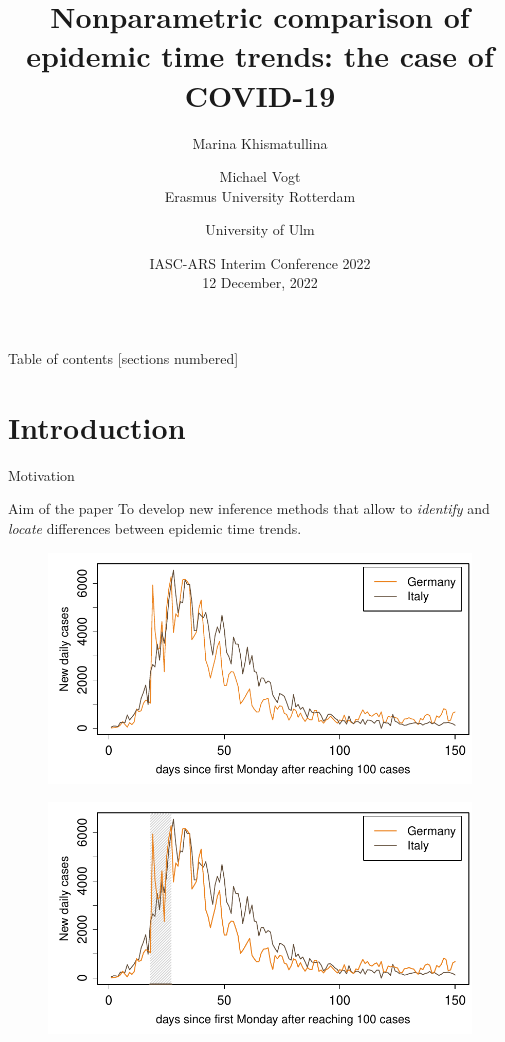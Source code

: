 \documentclass[10pt]{beamer}
\title{Nonparametric comparison of epidemic time trends: the case of COVID-19}
\author{Marina Khismatullina \and \hspace{11mm} Michael Vogt \\ Erasmus University Rotterdam \and University of Ulm}
\date{\vspace{5mm} IASC-ARS Interim Conference 2022 \\ 12 December, 2022}
\begin{document}
\maketitle

\begin{frame}{Table of contents}
  [sections numbered]
  \tableofcontents[hideallsubsections]
\end{frame}

\section{Introduction}


\begin{frame}{Motivation}

{ \begin{block}{Aim of the paper}
	To develop new inference methods that allow to \textit{identify} and \textit{locate} differences between epidemic time trends.
\end{block}}
	{\begin{figure}
    		\centering
    		\includegraphics[height=0.45\textheight]{plots/Germany_and_Italy.pdf}
  	\end{figure}}
	{\onslide<3>
	\vspace{-46,81mm}
	\begin{figure}
    		\centering
    		\includegraphics[height=0.45\textheight]{plots/Germany_and_Italy_1.pdf}

\end{figure}}
\end{frame}
\end{document}
